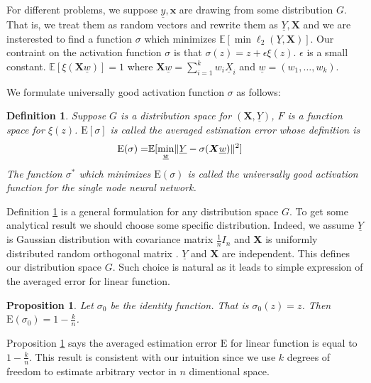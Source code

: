 \documentclass[conference,letterpaper]{IEEEtran}
\newtheorem{definition}{Definition}
\newtheorem{proposition}{Proposition}
\DeclarePairedDelimiter\norm{\lVert}{\rVert}
\def\E{\mathbb{E}}
\begin{document}
For different problems, we suppose $\underline{y}, \bm{x}$ are drawing from some distribution $G$.
That is, we treat them as random vectors and rewrite them as $\underline{Y}, \bm{X}$ and
we are insterested to find a function $\sigma$ which minimizes
$\E[ \min \ell_2(\underline{Y}, \bm{X})]$.
Our contraint on the activation function $\sigma$ is that
$\sigma(z) = z + \epsilon \xi(z)$.
$\epsilon$ is a small constant.
$\E[\xi(\bm{X}\underline{w})]=1$ where
$\bm{X}\underline{w} = \sum_{i=1}^k w_i \underline{X}_i$ and  $\underline{w}=(w_1, \dots, w_k)$.

We formulate universally good activation function $\sigma$ as follows:
\begin{definition}\label{def:ug}
Suppose $G$ is a distribution space for $(\bm{X}, \underline{Y})$,
$F$ is a function space for $\xi(z)$.
$\mathrm{E}[\sigma]$ is called the averaged estimation error whose definition is
\begin{align}\label{eq:ug}
\mathrm{E}(\sigma) = & \E[ \min_{\underline{w}} \norm{\underline{Y} - \sigma(\bm{X} \underline{w})}^2] 
\end{align}
The function $\sigma^*$ which minimizes $\mathrm{E}(\sigma)$
is called the universally good activation function for the single node neural network.
\end{definition}

Definition \ref{def:ug} is a general formulation for any distribution space $G$.
To get some analytical result we should choose some specific distribution.
Indeed, we assume $\underline{Y}$ is Gaussian distribution with covariance matrix $\frac{1}{n} I_n$ and
$\bm{X}$ is uniformly distributed random orthogonal matrix \cite{rm}.
$\underline{Y}$ and $\bm{X}$ are independent.
This defines our distribution space $G$. Such choice is natural as it leads to simple expression of the averaged error for linear function.

\begin{proposition}\label{prop:linear}
Let $\sigma_0$ be the identity function. That is $\sigma_0(z) = z$. Then $\mathrm{E}(\sigma_0) = 1 - \frac{k}{n}$.\end{proposition}

Proposition \ref{prop:linear} says the averaged estimation error $\mathrm{E}$ for linear function is equal to $1-\frac{k}{n}$.
This result is consistent with our intuition
since we use $k$ degrees of freedom to estimate arbitrary vector in $n$ dimentional space.
\end{document}
